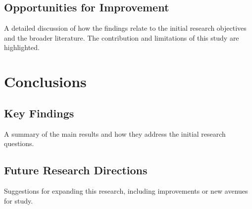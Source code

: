 \documentclass[a4paper,12pt]{report}
\begin{document}
\section{Opportunities for Improvement}


A detailed discussion of how the findings relate to the initial research objectives and the broader literature. The contribution and limitations of this study are highlighted.

\chapter{Conclusions}

\section{Key Findings}
A summary of the main results and how they address the initial research questions.

\section{Future Research Directions}
Suggestions for expanding this research, including improvements or new avenues for study.
\end{document}
